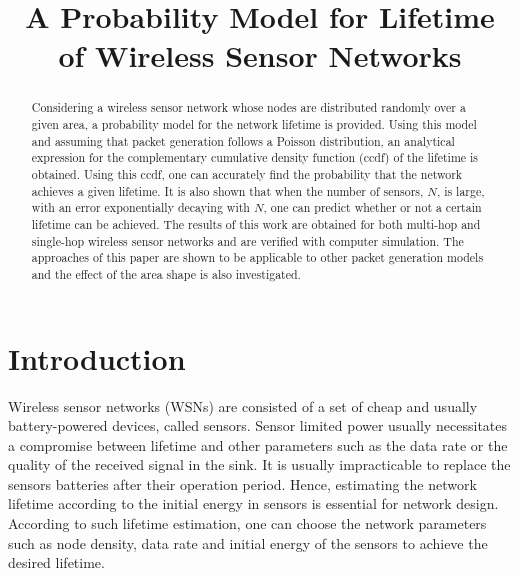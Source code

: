 \documentclass[conference]{IEEEtran}
\begin{document}
\title{A Probability Model for Lifetime of Wireless Sensor Networks}

\author{ }

\maketitle
\begin{abstract}
Considering a wireless sensor network whose nodes are distributed
randomly over a given area, a probability model for the network
lifetime is provided. Using this model and assuming that packet
generation follows a Poisson distribution, an analytical expression
for the complementary cumulative density function (ccdf) of the
lifetime is obtained. Using this ccdf, one can accurately find the
probability that the network achieves a given lifetime. It is also
shown that when the number of sensors, $N$, is large, with an error
exponentially decaying with $N$, one can predict whether or not a
certain lifetime can be achieved. The results of this work are
obtained for both multi-hop and single-hop wireless sensor networks
and are verified with computer simulation. The approaches of this
paper are shown to be applicable to other packet generation models
and the effect of the area shape is also investigated.
\end{abstract}

\section{Introduction} \label{Section Introduction}
Wireless sensor networks (WSNs) are consisted of a set of cheap and
usually battery-powered devices, called sensors. Sensor limited
power usually necessitates a compromise between lifetime and other
parameters such as the data rate or the quality of the received
signal in the sink. It is usually impracticable to replace the
sensors batteries after their operation period. Hence, estimating
the network lifetime according to the initial energy in sensors is
essential for network design. According to such lifetime estimation,
one can choose the network parameters such as node density, data
rate and initial energy of the sensors to achieve the desired
lifetime.
\end{document}
